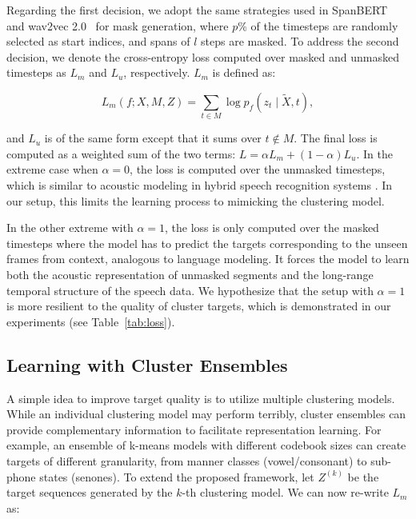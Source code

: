 Regarding the first decision, we adopt the same strategies used in SpanBERT~\cite{joshi2020spanbert} and wav2vec 2.0~\cite{baevski2020wav2vec} for mask generation, where $p$\% of the timesteps are randomly selected as start indices, and spans of $l$ steps are masked. To address the second decision, we denote the cross-entropy loss computed over masked and unmasked timesteps as $L_m$ and $L_u$, respectively. $L_m$ is defined as:

\begin{equation}
    L_m(f; X, M, Z) = \sum_{t \in M} \log p_f(z_t \mid \tilde{X}, t),
\end{equation}

and $L_u$ is of the same form except that it sums over $t \not\in M$. The final loss is computed as a weighted sum of the two terms: $L = \alpha L_m + (1-\alpha)L_u$. In the extreme case when $\alpha = 0$, the loss is computed over the unmasked timesteps, which is similar to acoustic modeling in hybrid speech recognition systems \cite{young1996large, abdel2012applying, povey2005discriminative, bourlard2012connectionist}. In our setup, this limits the learning process to mimicking the clustering model. 

In the other extreme with $\alpha=1$, the loss is only computed over the masked timesteps where the model has to predict the targets corresponding to the unseen frames from context, analogous to language modeling. It forces the model to learn both the acoustic representation of unmasked segments and the long-range temporal structure of the speech data. We hypothesize that the setup with $\alpha=1$ is more resilient to the quality of cluster targets, which is demonstrated in our experiments (see Table~\ref{tab:loss}).

\subsection{Learning with Cluster Ensembles} A simple idea to improve target quality is to utilize multiple clustering models. While an individual clustering model may perform terribly, cluster ensembles can provide complementary information to facilitate representation learning. For example, an ensemble of k-means models with different codebook sizes can create targets of different granularity, from manner classes (vowel/consonant) to sub-phone states (senones). To extend the proposed framework, let $Z^{(k)}$ be the target sequences generated by the $k$-th clustering model. We can now re-write $L_m$ as:

